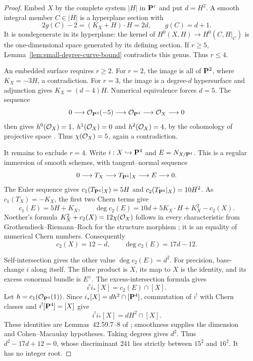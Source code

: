 \begin{proof}
Embed $X$ by the complete system $|H|$ in $\mathbf P^r$ and put
$d=H^2$. A smooth integral member $C\in|H|$ is a hyperplane
section with
\[
 2g(C)-2=(K_X+H)\cdot H=2d,
 \qquad g(C)=d+1.
\]
It is nondegenerate in its hyperplane: the kernel of
$H^0(X,H)\to H^0(C,H|_C)$ is the one-dimensional space
generated by its defining section. If $r\geq5$,
Lemma~\ref{lem:small-degree-curve-bound} contradicts this
genus. Thus $r\leq4$.

An embedded surface requires $r\geq2$. For $r=2$, the image
is all of $\mathbf P^2$, where $K_X=-3H$, a contradiction. For
$r=3$, the image is a degree-$d$ hypersurface and adjunction
gives $K_X=(d-4)H$. Numerical equivalence forces $d=5$.
The sequence
\[
 0\longrightarrow\mathcal O_{\mathbf P^3}(-5)
 \longrightarrow\mathcal O_{\mathbf P^3}\longrightarrow\mathcal O_X
 \longrightarrow0
\]
then gives $h^0(\mathcal O_X)=1$, $h^1(\mathcal O_X)=0$ and
$h^2(\mathcal O_X)=4$, by the cohomology of projective space
\cite[Tag 01XT]{Stacks}. Thus $\chi(\mathcal O_X)=5$, again a
contradiction.

It remains to exclude $r=4$. Write $i:X\hookrightarrow\mathbf P^4$
and $E=N_{X/\mathbf P^4}$. This is a regular immersion of smooth
schemes, with tangent--normal sequence
\[
 0\longrightarrow T_X\longrightarrow T_{\mathbf P^4}|_X
 \longrightarrow E\longrightarrow0.
\]
The Euler sequence gives $c_1(T_{\mathbf P^4}|_X)=5H$ and
$c_2(T_{\mathbf P^4}|_X)=10H^2$. As $c_1(T_X)=-K_X$, the first
two Chern terms give
\[
 c_1(E)=5H+K_X,\qquad
 \deg c_2(E)=10d+5K_X\cdot H+K_X^2-c_2(X).
\]
Noether's formula $K_X^2+c_2(X)=12\chi(\mathcal O_X)$ follows
in every characteristic from Grothendieck--Riemann--Roch for
the structure morphism \cite[Tag 02UO]{Stacks}; it is an
equality of numerical Chern numbers. Consequently
\[
 c_2(X)=12-d,\qquad \deg c_2(E)=17d-12.
\]

Self-intersection gives the other value $\deg c_2(E)=d^2$.
For precision, base-change $i$ along itself. The fibre product
is $X$, its map to $X$ is the identity, and its excess
conormal bundle is $E^\vee$. The excess-intersection formula
\cite[Tag 0FV9]{Stacks} gives
\[
 i^!i_*[X]=c_2(E)\cap[X].
\]
Let $h=c_1(\mathcal O_{\mathbf P^4}(1))$. Since
$i_*[X]=d h^2\cap[\mathbf P^4]$, commutation of $i^!$ with
Chern classes and $i^![\mathbf P^4]=[X]$ give
\[
 i^!i_*[X]=d H^2\cap[X].
\]
These identities are Lemmas~42.59.7--8 of
\cite[Tag 0FEZ]{Stacks}; smoothness supplies the dimension
and Cohen--Macaulay hypotheses. Taking degrees gives $d^2$.
Thus $d^2-17d+12=0$, whose discriminant $241$ lies strictly
between $15^2$ and $16^2$. It has no integer root.
\end{proof}

